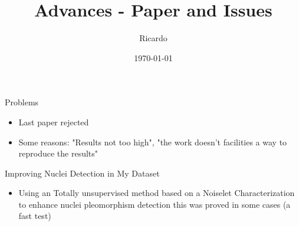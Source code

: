 \documentclass{beamer}
\title[Paper and Issues]{Advances - Paper and Issues}
\author{Ricardo}
\institute{}
\date{\today}
\begin{document}
\begin{frame}
  \titlepage
\end{frame}



\begin{frame}{Problems}

\begin{itemize}
    \item Last paper rejected
    \pause 
    \item Some reasons: "Results not too high", "the work doesn't facilities a way to reproduce the results"
    
\end{itemize}

\end{frame}


\begin{frame}{Improving Nuclei Detection in My Dataset}

\begin{itemize}

\item Using an Totally unsupervised method based on a Noiselet Characterization to enhance nuclei pleomorphism detection this was proved in some cases (a fast test)

\end{itemize}

\end{frame}
\end{document}
